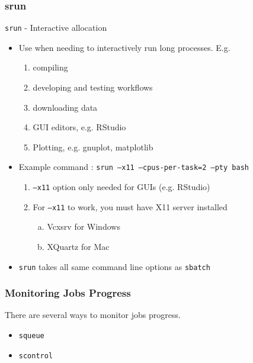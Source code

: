 \documentclass{beamer}
\newcommand{\code}[1]{\colorbox{codegray}{\texttt{#1}}}
\begin{document}
\begin{frame}
\frametitle{srun}
\code{srun} - Interactive allocation 
\bigskip
\begin{itemize}
    \item Use when needing to interactively run long processes. E.g.
        \begin{enumerate}
            \pause
            \item compiling
            \pause 
            \item developing and testing workflows
            \pause 
            \item downloading data
            \pause 
            \item GUI editors, e.g. RStudio
            \pause 
            \item Plotting, e.g. gnuplot, matplotlib
        \end{enumerate}
    \pause
    \item Example command : \code{srun --x11 --cpus-per-task=2 --pty bash}
        \pause
        \begin{enumerate}
            \item \code{--x11} option only needed for GUIs (e.g. RStudio)
            \pause
            \item For \code{--x11} to work, you must have X11 server installed
            \pause
            \begin{enumerate}[a)]
                \item Vcxsrv for Windows
                \pause
                \item XQuartz for Mac
            \end{enumerate}
        \end{enumerate}
    \pause
    \item \code{srun} takes all same command line options as \code{sbatch}
\end{itemize}
\end{frame}


\begin{frame}
\frametitle{Monitoring Jobs Progress}
There are several ways to monitor jobs progress.  
\bigskip
\begin{itemize}
    \item \code{squeue}
    \pause
    \bigskip
    \item \code{scontrol}
\end{itemize}
\end{frame}
\end{document}
